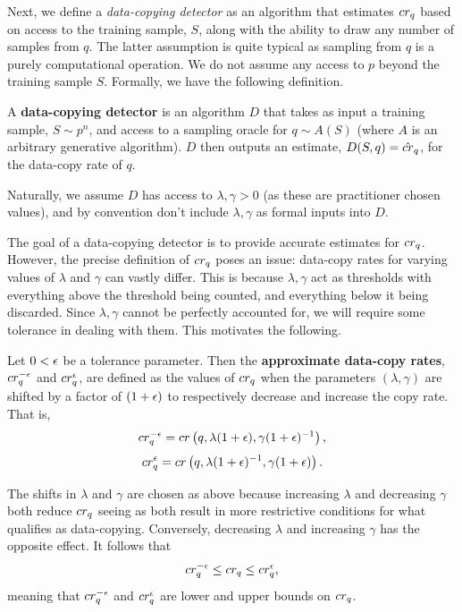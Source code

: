 Next, we define a \textit{data-copying detector} as an algorithm that estimates $cr_q$ based on access to the training sample, $S$, along with the ability to draw any number of samples from $q$. The latter assumption is quite typical as sampling from $q$ is a purely computational operation. We do not assume any access to $p$ beyond the training sample $S$. Formally, we have the following definition.

\begin{definition}\label{def:data_copy_detector}
A \textbf{data-copying detector} is an algorithm $D$ that takes as input a training sample, $S \sim p^n$, and access to a sampling oracle for $q \sim A(S)$ (where $A$ is an arbitrary generative algorithm). $D$ then outputs an estimate, $D(S, q) = \hat{cr}_q$, for the data-copy rate of $q$. 
\end{definition}

Naturally, we assume $D$ has access to $\lambda, \gamma >0$ (as these are practitioner chosen values), and by convention don't include $\lambda, \gamma$ as formal inputs into $D$. 

The goal of a data-copying detector is to provide accurate estimates for $cr_q$. However, the precise definition of $cr_q$ poses an issue: data-copy rates for varying values of $\lambda$ and $ \gamma$ can vastly differ. This is because $\lambda, \gamma$ act as thresholds with everything above the threshold being counted, and everything below it being discarded. Since $\lambda, \gamma$ cannot be perfectly accounted for, we will require some tolerance in dealing with them. This motivates the following.

\begin{definition}\label{defn:approx_data_copy_rate}
Let $0 < \epsilon$ be a tolerance parameter. Then the \textbf{approximate data-copy rates}, $cr_q^{-\epsilon}$ and $cr_q^\epsilon$, are defined as the values of $cr_q$ when the parameters $(\lambda, \gamma)$ are shifted by a factor of $(1+\epsilon)$ to respectively decrease and increase the copy rate. That is, $$cr_q^{-\epsilon} = cr\left(q, \lambda (1+\epsilon), \gamma (1+\epsilon)^{-1}\right),$$ $$cr_q^{\epsilon} = cr\left(q, \lambda (1+\epsilon)^{-1}, \gamma (1+\epsilon)\right).$$
\end{definition}

The shifts in $\lambda$ and $\gamma$ are chosen as above because increasing $\lambda$ and decreasing $\gamma$ both reduce $cr_q$ seeing as both result in more restrictive conditions for what qualifies as data-copying. Conversely, decreasing $\lambda$ and increasing $\gamma$ has the opposite effect. It follows that $$cr_q^{-\epsilon} \leq cr_q \leq cr_q^{\epsilon},$$ meaning that $cr_q^{-\epsilon}$ and $cr_q^{\epsilon}$ are lower and upper bounds on $cr_q$. 

